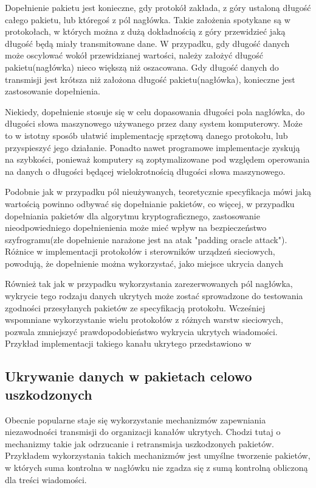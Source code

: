 \documentclass[a4paper, twoside, 12pt]{report}
\begin{document}
        Dopełnienie pakietu jest konieczne, gdy protokół zakłada, z góry ustaloną długość
        całego pakietu, lub któregoś z pól nagłówka. Takie założenia spotykane są
        w protokołach, w których można z dużą dokładnością z góry przewidzieć jaką długość
        będą miały transmitowane dane. W przypadku, gdy długość danych może oscylować
        wokół przewidzianej wartości, należy założyć długość pakietu(nagłówka)
        nieco większą niż oszacowana. Gdy długość danych do transmisji jest krótsza niż
        założona długość pakietu(nagłówka), konieczne jest zastosowanie dopełnienia.

        Niekiedy, dopełnienie stosuje się w celu dopasowania długości pola nagłówka,
        do długości słowa maszynowego używanego przez dany system komputerowy. Może
        to w istotny sposób ułatwić implementację sprzętową danego protokołu, lub
        przyspieszyć jego działanie. Ponadto nawet programowe implementacje zyskują
        na szybkości, ponieważ komputery są zoptymalizowane pod względem operowania
        na danych o długości będącej wielokrotnością długości słowa maszynowego.

        Podobnie jak w przypadku pól nieużywanych, teoretycznie specyfikacja
        mówi jaką wartością powinno odbywać się dopełnianie pakietów, co więcej,
        w przypadku dopełniania pakietów dla algorytmu kryptograficznego, zastosowanie
        nieodpowiedniego dopełnienienia może mieć wpływ na bezpieczeństwo szyfrogramu(złe dopełnienie narażone
        jest na atak "padding oracle attack"). Różnice w implementacji protokołów
        i sterowników urządzeń sieciowych, powodują, że dopełnienie można wykorzystać,
        jako miejsce ukrycia danych\cite{PADSTEG}

        Również tak jak w przypadku wykorzystania zarezerwowanych pól nagłówka,
        wykrycie tego rodzaju danych ukrytych może zostać sprowadzone do testowania
        zgodności przesyłanych pakietów ze specyfikacją protokołu. Wcześniej wspomniane
        wykorzystanie wielu protokołów z różnych warstw sieciowych, pozwala zmniejszyć
        prawdopodobieństwo wykrycia ukrytych wiadomości. Przykład implementacji
        takiego kanału ukrytego przedstawiono w \cite{PADSTEG}

        \subsection{Ukrywanie danych w pakietach celowo uszkodzonych} \label{USZKODZONEPAKIETY}
        Obecnie popularne staje się wykorzystanie mechanizmów zapewniania niezawodności
        transmisji do organizacji kanałów ukrytych. Chodzi tutaj o mechanizmy
        takie jak odrzucanie i retransmisja uszkodzonych pakietów. Przykładem wykorzystania takich
        mechanizmów jest umyślne tworzenie pakietów, w których suma kontrolna w nagłówku
        nie zgadza się z sumą kontrolną obliczoną dla treści wiadomości.
\end{document}
